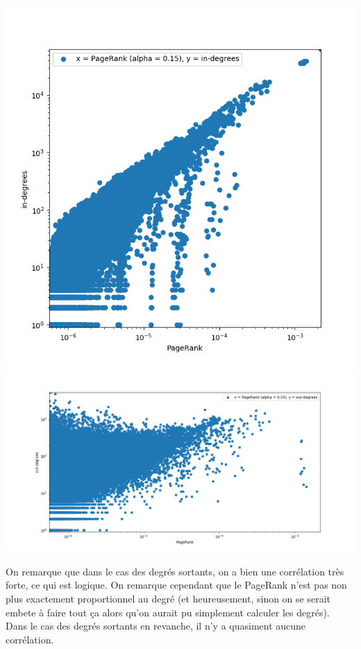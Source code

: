 \documentclass[a4paper]{report}
\begin{document}
\begin{center}
  \includegraphics[width=0.25\paperwidth]{assets/pagerankindegs.png}
  \includegraphics[width=0.25\paperwidth]{assets/pagerankoutdegs.png}
\end{center}

On remarque que dans le cas des degrés sortants, on a bien une corrélation très forte, ce qui est logique. On remarque cependant que le PageRank n'est pas non plus exactement proportionnel au degré (et heureusement, sinon on se serait embete à faire tout ça alors qu'on aurait pu simplement calculer les degrés).\\
Dans le cas des degrés sortants en revanche, il n'y a quasiment aucune corrélation.
\end{document}

